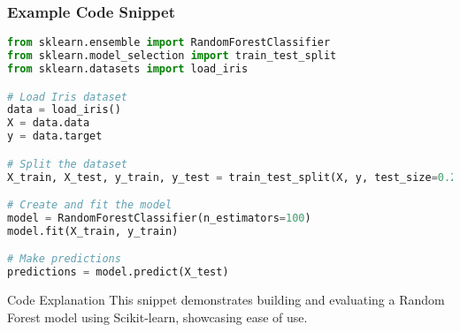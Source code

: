 \documentclass{beamer}
\begin{document}
\begin{frame}[fragile]
    \frametitle{Example Code Snippet}
    \begin{lstlisting}[language=Python]
from sklearn.ensemble import RandomForestClassifier
from sklearn.model_selection import train_test_split
from sklearn.datasets import load_iris

# Load Iris dataset
data = load_iris()
X = data.data
y = data.target

# Split the dataset
X_train, X_test, y_train, y_test = train_test_split(X, y, test_size=0.2, random_state=42)

# Create and fit the model
model = RandomForestClassifier(n_estimators=100)
model.fit(X_train, y_train)

# Make predictions
predictions = model.predict(X_test)
    \end{lstlisting}
    \begin{block}{Code Explanation}
        This snippet demonstrates building and evaluating a Random Forest model using Scikit-learn, showcasing ease of use.
    \end{block}
\end{frame}
\end{document}
